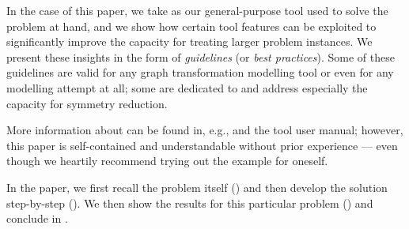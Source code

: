 In the case of this paper, we take \GROOVE as our general-purpose tool used to
solve the problem at hand, and we show how certain tool features can be
exploited to significantly improve the capacity for treating larger problem
instances. We present these insights in the form of \emph{guidelines} (or
\emph{best practices}). Some of these guidelines are valid for any graph
transformation modelling tool or even for any modelling attempt at all; some are
dedicated to \GROOVE and address especially the capacity for symmetry reduction.

More information about \GROOVE can be found in, e.g., \cite{Ren03a,GMR+12} and
the tool user manual; however, this paper is self-contained and understandable
without prior experience --- even though we heartily recommend trying out the
example for oneself.

\medskip\noindent In the paper, we first recall the problem
itself () and then develop the solution step-by-step
(). We then show the results for this particular problem
() and conclude in .
